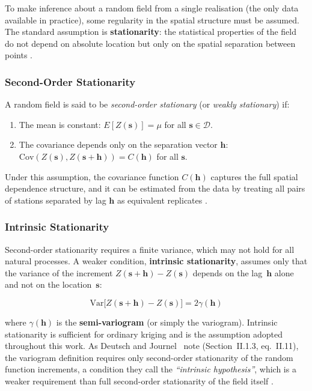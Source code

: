 To make inference about a random field from a single realisation (the only
data available in practice), some regularity in the spatial structure
must be assumed.
The standard assumption is \textbf{stationarity}: the statistical properties
of the field do not depend on absolute location but only on the spatial
separation between points \cite{hofstra2008comparison, haylock2008european}.

\subsubsection{Second-Order Stationarity}

A random field is said to be \textit{second-order stationary} (or
\textit{weakly stationary}) if:

\begin{enumerate}
    \item The mean is constant: $E[Z(\mathbf{s})] = \mu$ for all
    $\mathbf{s} \in \mathcal{D}$.
    \item The covariance depends only on the separation vector $\mathbf{h}$:
    $\text{Cov}(Z(\mathbf{s}), Z(\mathbf{s} + \mathbf{h})) = C(\mathbf{h})$
    for all $\mathbf{s}$.
\end{enumerate}

\noindent Under this assumption, the covariance function $C(\mathbf{h})$
captures the full spatial dependence structure, and it can be estimated from
the data by treating all pairs of stations separated by lag $\mathbf{h}$ as
equivalent replicates \cite{cressie1993}.

\subsubsection{Intrinsic Stationarity}

Second-order stationarity requires a finite variance, which may not hold for
all natural processes.
A weaker condition, \textbf{intrinsic stationarity}, assumes only that the
variance of the increment $Z(\mathbf{s}+\mathbf{h}) - Z(\mathbf{s})$
depends on the lag~$\mathbf{h}$ alone and not on the location~$\mathbf{s}$:

\begin{equation}
    \text{Var}\bigl[Z(\mathbf{s} + \mathbf{h}) - Z(\mathbf{s})\bigr]
    = 2\gamma(\mathbf{h})
    \label{eq:intrinsic_stationarity}
\end{equation}

\noindent where $\gamma(\mathbf{h})$ is the \textbf{semi-variogram} (or simply
the variogram).
Intrinsic stationarity is sufficient for ordinary kriging and is the assumption
adopted throughout this work.
As Deutsch and Journel~\cite{deutsch1998gslib} note (Section~II.1.3, eq.~II.11), the
variogram definition requires only second-order stationarity of the random
function increments, a condition they call the \textit{``intrinsic hypothesis''}, which
is a weaker requirement than full second-order stationarity of the field
itself \cite{matheron1963principles, cressie1993}.

